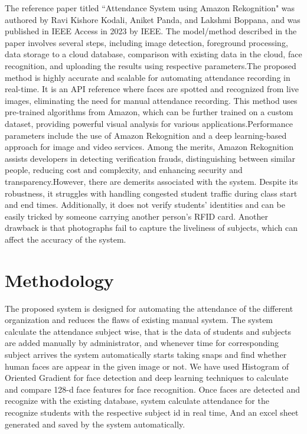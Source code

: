 \documentclass[12pt,a4paper]{report}
\begin{document}
\par The reference paper titled ``Attendance System using Amazon Rekognition" was authored by Ravi Kishore Kodali, Aniket Panda, and Lakshmi Boppana, and was published in IEEE Access in 2023 by IEEE. The model/method described in the paper involves several steps, including image detection, foreground processing, data storage to a cloud database, comparison with existing data in the cloud, face recognition, and uploading the results using respective parameters.The proposed method is highly accurate and scalable for automating attendance recording in real-time. It is an API reference where faces are spotted and recognized from live images, eliminating the need for manual attendance recording. This method uses pre-trained algorithms from Amazon, which can be further trained on a custom dataset, providing powerful visual analysis for various applications.Performance parameters include the use of Amazon Rekognition and a deep learning-based approach for image and video services. Among the merits, Amazon Rekognition assists developers in detecting verification frauds, distinguishing between similar people, reducing cost and complexity, and enhancing security and transparency.However, there are demerits associated with the system. Despite its robustness, it struggles with handling congested student traffic during class start and end times. Additionally, it does not verify students' identities and can be easily tricked by someone carrying another person's RFID card. Another drawback is that photographs fail to capture the liveliness of subjects, which can affect the accuracy of the system.

\newpage
\section{Methodology}
\par The proposed system is designed for automating the attendance of the different organization and reduces the flaws of existing manual system. The system calculate the attendance subject wise, that is the data of students and subjects are added manually by administrator, and whenever time for corresponding subject arrives the system automatically starts taking snaps and find whether human faces are appear in the given image or not. We have used Histogram of Oriented Gradient for face detection and deep learning techniques to calculate and compare 128-d face features for face recognition. Once faces are detected and recognize with the existing database, system calculate attendance for the recognize students with the respective subject id in real time, And an excel sheet generated and saved by the system automatically.
\end{document}
